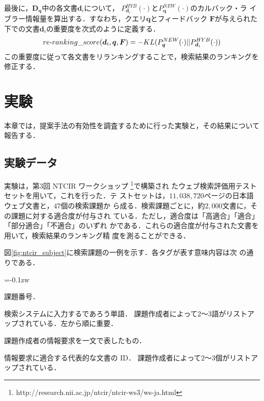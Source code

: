 \documentclass[japanese]{jnlp_1.4}
\begin{document}
最後に，$\bm{D}_{\bm{q}}$中の各文書$\bm{d}_{i}$について，
$P^{HYB}_{\bm{d}_{i}}(\cdot)$と$P^{NEW}_{\bm{q}}(\cdot)$のカルバック・ラ
イブラー情報量を算出する．すなわち，クエリ$\bm{q}$とフィードバック
$\bm{F}$が与えられた下での文書$\bm{d}_{i}$の重要度を次式のように定義する．
\begin{eqnarray}
 re\mathchar`-ranking\_score(\bm{d}_{i},\bm{q},\bm{F})
 =
 - KL(P^{NEW}_{\bm{q}}(\cdot)||P^{HYB}_{\bm{d}_{i}}(\cdot)) \nonumber
\end{eqnarray}
この重要度に従って各文書をリランキングすることで，検索結果のランキングを
修正する．



\section{実験} \label{sec:experiments}

本章では，提案手法の有効性を調査するために行った実験と，その結果について
報告する．



\subsection{実験データ} \label{ssec:data}

実験は，第$3$回 NTCIR ワークショップ
\footnote{http://research.nii.ac.jp/ntcir/ntcir-ws3/ws-ja.html}で構築され
たウェブ検索評価用テストセット\cite{Eguchi2002}を用いて，これを行った．テ
ストセットは，$11,038,720$ページの日本語ウェブ文書と，$47$個の検索課題か
ら成る．検索課題ごとに，約$2,000$文書に，その課題に対する適合度が付与され
ている．ただし，適合度は「高適合」「適合」「部分適合」「不適合」のいずれ
かである．これらの適合度が付与された文書を用いて，検索結果のランキング精
度を測ることができる．

図\ref{fig:ntcir_subject}に検索課題の一例を示す．各タグが表す意味内容は次
の通りである．
\begin{description}
 \itemsep=-0.1zw
 \item[NUM] 課題番号．
 \item[TITLE] 検索システムに入力するであろう単語．
課題作成者によって$2$〜$3$語がリストアップされている．左から順に重要．
 \item[DESC] 課題作成者の情報要求を一文で表したもの．
 \item[RDOC] 情報要求に適合する代表的な文書の ID．
課題作成者によって$2$〜$3$個がリストアップされている．
\end{description}
\end{document}
